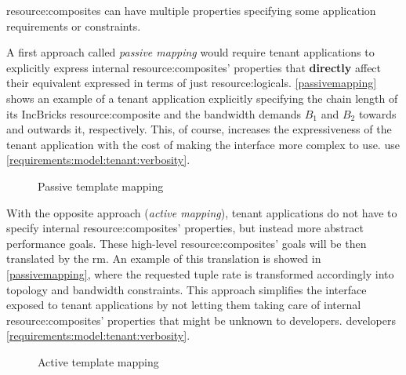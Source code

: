 \Glspl{resource:composite} can have multiple properties specifying some application requirements or constraints.
\ifdefined\THESISSUMMARY \else

\fi
A first approach called \textit{passive mapping} would require tenant applications to explicitly express internal \glspl{resource:composite}' properties that \textbf{directly} affect their equivalent expressed in terms of just \glspl{resource:logical}.
\ifdefined\THESISSUMMARY \else
\autoref{passivemapping} shows an example of a tenant application explicitly specifying the chain length of its IncBricks \cite{incbricks} \gls{resource:composite} and the bandwidth demands $B_1$ and $B_2$ towards and outwards it, respectively.
\fi
This, of course, increases the expressiveness of the tenant application with the cost of making the interface more complex to
\ifdefined\THESISSUMMARY
use.
\else
use \xmark \ref{requirements:model:tenant:verbosity}.
\fi
\ifdefined\THESISSUMMARY \else
\begin{figure}[!htb]
    \centering
    \usebox{\passivemapping}
    \caption{Passive template mapping}
    \label{passivemapping}
\end{figure}
\fi
\ifdefined\THESISSUMMARY \else

\fi
With the opposite approach (\textit{active mapping}), tenant applications do not have to specify internal \glspl{resource:composite}' properties, but instead more abstract performance goals.
These high-level \glspl{resource:composite}' goals will be then translated by the \gls{rm}.
\ifdefined\THESISSUMMARY \else
An example of this translation is showed in \autoref{passivemapping}, where the requested tuple rate is transformed accordingly into topology and bandwidth constraints.
\fi
This approach simplifies the interface exposed to tenant applications by not letting them taking care of internal \glspl{resource:composite}' properties that might be unknown to
\ifdefined\THESISSUMMARY
developers.
\else
developers \cmark \ref{requirements:model:tenant:verbosity}.
\fi

\ifdefined\THESISSUMMARY \else
\begin{figure}[!htb]
    \centering
    \usebox{\activemapping}
    \caption{Active template mapping}
    \label{activemapping}
\end{figure}
\fi
